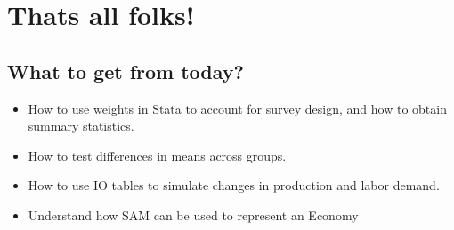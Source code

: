 \documentclass[
  letterpaper,
  DIV=11,
  numbers=noendperiod]{scrartcl}
\providecommand{\tightlist}{%
  \setlength{\itemsep}{0pt}\setlength{\parskip}{0pt}}\usepackage{longtable,booktabs,array}
\begin{document}
\section{Thats all folks!}\label{thats-all-folks}

\subsection{What to get from today?}\label{what-to-get-from-today}

\begin{itemize}
\tightlist
\item
  How to use weights in Stata to account for survey design, and how to
  obtain summary statistics.
\item
  How to test differences in means across groups.
\item
  How to use IO tables to simulate changes in production and labor
  demand.
\item
  Understand how SAM can be used to represent an Economy
\end{itemize}
\end{document}
